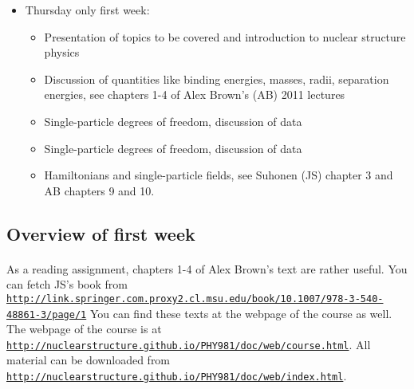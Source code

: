 \documentclass[%
twoside,                 %
final,                   %
10pt]{article}
\begin{document}
\begin{itemize}
\item Thursday only first week:
\begin{itemize}

 \item Presentation of topics to be covered and introduction to nuclear structure physics

 \item Discussion of quantities like binding energies, masses, radii, separation energies, see chapters 1-4 of Alex Brown's (AB) 2011 lectures

 \item Single-particle degrees of freedom, discussion of data

 \item Single-particle degrees of freedom, discussion of data

 \item Hamiltonians and single-particle fields, see  Suhonen (JS) chapter 3  and AB chapters 9 and 10.
\end{itemize}

\noindent
\end{itemize}

\noindent




\subsection*{Overview of first week}

\paragraph{}
As a reading assignment, chapters 1-4 of Alex Brown's text are rather useful.
You can fetch JS's book from \href{{http://link.springer.com.proxy2.cl.msu.edu/book/10.1007/978-3-540-48861-3/page/1}}{\nolinkurl{http://link.springer.com.proxy2.cl.msu.edu/book/10.1007/978-3-540-48861-3/page/1}}
You can find these texts at the webpage of the course as well.
The webpage of the course is at \href{{http://nuclearstructure.github.io/PHY981/doc/web/course.html}}{\nolinkurl{http://nuclearstructure.github.io/PHY981/doc/web/course.html}}.
All material can be downloaded from \href{{http://nuclearstructure.github.io/PHY981/doc/web/index.html}}{\nolinkurl{http://nuclearstructure.github.io/PHY981/doc/web/index.html}}.
\end{document}
